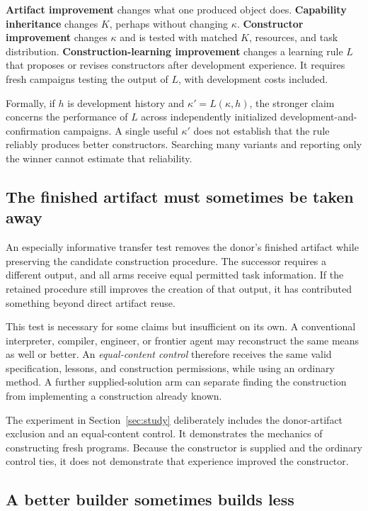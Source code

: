 \textbf{Artifact improvement} changes what one produced object does. \textbf{Capability inheritance} changes $K$, perhaps without changing $\kappa$. \textbf{Constructor improvement} changes $\kappa$ and is tested with matched $K$, resources, and task distribution. \textbf{Construction-learning improvement} changes a learning rule $L$ that proposes or revises constructors after development experience. It requires fresh campaigns testing the output of $L$, with development costs included.

Formally, if $h$ is development history and $\kappa'=L(\kappa,h)$, the stronger claim concerns the performance of $L$ across independently initialized development-and-confirmation campaigns. A single useful $\kappa'$ does not establish that the rule reliably produces better constructors. Searching many variants and reporting only the winner cannot estimate that reliability.

\subsection{The finished artifact must sometimes be taken away}

An especially informative transfer test removes the donor's finished artifact while preserving the candidate construction procedure. The successor requires a different output, and all arms receive equal permitted task information. If the retained procedure still improves the creation of that output, it has contributed something beyond direct artifact reuse.

This test is necessary for some claims but insufficient on its own. A conventional interpreter, compiler, engineer, or frontier agent may reconstruct the same means as well or better. An \emph{equal-content control} therefore receives the same valid specification, lessons, and construction permissions, while using an ordinary method. A further supplied-solution arm can separate finding the construction from implementing a construction already known.

The experiment in Section~\ref{sec:study} deliberately includes the donor-artifact exclusion and an equal-content control. It demonstrates the mechanics of constructing fresh programs. Because the constructor is supplied and the ordinary control ties, it does not demonstrate that experience improved the constructor.

\subsection{A better builder sometimes builds less}

